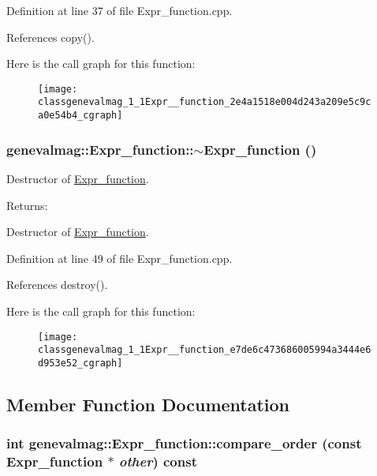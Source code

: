 Definition at line 37 of file Expr\_\-function.cpp.

References copy().

Here is the call graph for this function:\nopagebreak
\begin{figure}[H]
\begin{center}
\leavevmode
\texttt{[image: classgenevalmag\_1\_1Expr\_\_function\_2e4a1518e004d243a209e5c9ca0e54b4\_cgraph]}
\end{center}
\end{figure}
\hypertarget{classgenevalmag_1_1Expr__function_e7de6c473686005994a3444e6d953e52}{
\subsubsection[{$\sim$Expr\_\-function}]{\setlength{\rightskip}{0pt plus 5cm}genevalmag::Expr\_\-function::$\sim$Expr\_\-function ()}}
\label{classgenevalmag_1_1Expr__function_e7de6c473686005994a3444e6d953e52}


Destructor of \hyperlink{classgenevalmag_1_1Expr__function}{Expr\_\-function}. \begin{Desc}
\item[Returns:]\end{Desc}
Destructor of \hyperlink{classgenevalmag_1_1Expr__function}{Expr\_\-function}. 

Definition at line 49 of file Expr\_\-function.cpp.

References destroy().

Here is the call graph for this function:\nopagebreak
\begin{figure}[H]
\begin{center}
\leavevmode
\texttt{[image: classgenevalmag\_1\_1Expr\_\_function\_e7de6c473686005994a3444e6d953e52\_cgraph]}
\end{center}
\end{figure}


\subsection{Member Function Documentation}
\hypertarget{classgenevalmag_1_1Expr__function_4608528d2e116c0794eb78f2724b6a18}{
\subsubsection[{compare\_\-order}]{\setlength{\rightskip}{0pt plus 5cm}int genevalmag::Expr\_\-function::compare\_\-order (const {\bf Expr\_\-function} $\ast$ {\em other}) const}}
\label{classgenevalmag_1_1Expr__function_4608528d2e116c0794eb78f2724b6a18}


